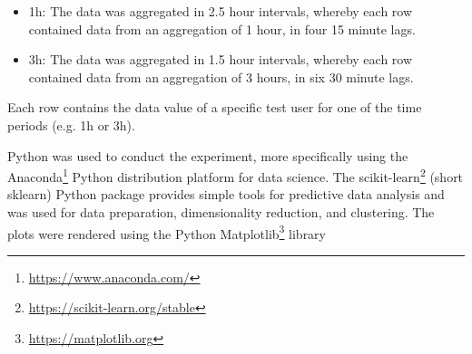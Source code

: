 \begin{itemize}
  \item 1h: The data was aggregated in 2.5 hour intervals, whereby each row contained data from an aggregation of 1 hour, in four 15 minute lags.
  \item 3h: The data was aggregated in 1.5 hour intervals, whereby each row contained data from an aggregation of 3 hours, in six 30 minute lags.
\end{itemize}

Each row contains the data value of a specific test user for one of the time periods (e.g. 1h or 3h).

Python was used to conduct the experiment, more specifically using the Anaconda\footnote{\url{https://www.anaconda.com/}} Python distribution platform for data science. The scikit-learn\footnote{\url{https://scikit-learn.org/stable}} (short sklearn) Python package provides simple tools for predictive data analysis and was used for data preparation, dimensionality reduction, and clustering. The plots were rendered using the Python Matplotlib\footnote{\url{https://matplotlib.org}} library